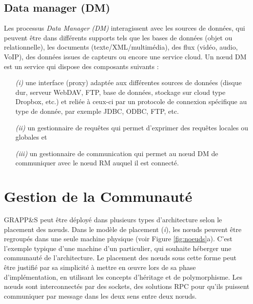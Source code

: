 \subsection*{Data manager (DM)} 
Les processus \textit{Data Manager (DM)} interagissent avec les sources de données, qui peuvent être dans différents supports tels que les bases de données (objet ou relationnelle), les documents (texte/XML/multimédia), des flux (vidéo, audio, VoIP), des données issues de capteurs ou encore une service cloud. 
Un n{\oe}ud DM est un service qui dispose des composants suivants : 
\begin{enumerate}
	\item[\textit{(i)}] une interface (proxy) adaptée aux différentes sources de données (disque dur, serveur WebDAV, FTP, base de données, stockage sur cloud type Dropbox, etc.) et reliée à ceux-ci par un protocole de connexion spécifique au type de donnée, par exemple JDBC, ODBC, FTP, etc. 
	\item[\textit{(ii)}] un gestionnaire de requêtes qui permet d'exprimer des requêtes locales ou globales et 
	\item[\textit{(iii)}] un gestionnaire de communication qui permet au n{\oe}ud DM de communiquer avec le n{\oe}ud RM auquel il est connecté. 
\end{enumerate}

\section{Gestion de la Communauté\label{SEC:Community}}

GRAPP\&S peut être déployé dans plusieurs types d'architecture selon le placement des n{\oe}uds. Dans le modèle de placement (\textit{i}), les n{\oe}uds peuvent être regroupés dans une seule machine physique (voir Figure \ref{fig:noeuds}a). C'est l'exemple typique d'une machine d'un particulier, qui souhaite héberger une communauté de l'architecture. Le placement des n{\oe}uds sous cette forme peut être justifié par sa simplicité à mettre en {\oe}uvre lors de sa phase d'implémentation, en utilisant les concepts d'héritage et de polymorphisme. Les n{\oe}uds sont interconnectés par des sockets, des solutions RPC pour qu'ils puissent communiquer par message dans les deux sens entre deux n{\oe}uds. 

